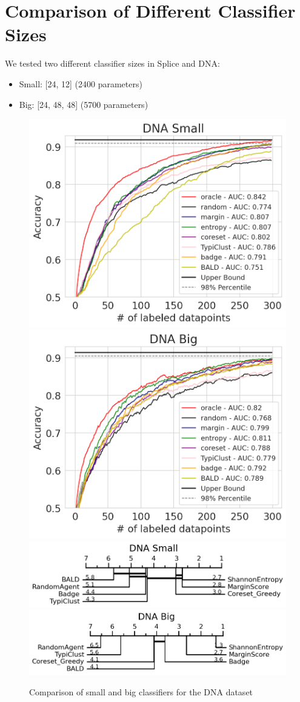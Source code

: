 \documentclass[]{article}
\begin{document}
\section{Comparison of Different Classifier Sizes}
We tested two different classifier sizes in Splice and DNA:
\begin{itemize}
	\item Small: [24, 12] (2400 parameters)
	\item Big: [24, 48, 48] (5700 parameters)
\end{itemize}
\begin{figure}
	\centering
	\includegraphics[width=0.49\linewidth]{img/supp_dna_small.png}
	\includegraphics[width=0.49\linewidth]{img/supp_dna_big.png}
	\includegraphics[width=0.49\linewidth]{img/supp_micro_dna_small.png}
	\includegraphics[width=0.49\linewidth]{img/supp_micro_dna_big.png}
	\caption{Comparison of small and big classifiers for the DNA dataset}
\end{figure}
\end{document}
